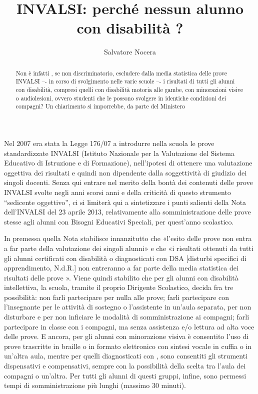 \author{Salvatore Nocera}
\title{INVALSI: perché nessun alunno con disabilità ?}
\label{nocera150513}
\begin{abstract}
Non è infatti , se non discriminatorio, escludere dalla media statistica delle prove INVALSI –- in corso di svolgimento nelle varie scuole –- i risultati di tutti gli alunni con disabilità, compresi quelli con disabilità motoria alle gambe, con minorazioni visive o audiolesioni, ovvero studenti che le possono svolgere in identiche condizioni dei compagni? Un chiarimento si imporrebbe, da parte del Ministero
\end{abstract}
\maketitle
Nel 2007 era stata la Legge 176/07 a introdurre nella scuola le prove standardizzate INVALSI (Istituto Nazionale per la Valutazione del Sistema Educativo di Istruzione e di Formazione), nell'ipotesi di ottenere una valutazione oggettiva dei risultati e quindi non dipendente dalla soggettività di giudizio dei singoli docenti.
Senza qui entrare nel merito della bontà dei contenuti delle prove INVALSI svolte negli anni scorsi anni e della criticità di questo strumento “sedicente oggettivo”, ci si limiterà qui a sintetizzare i punti salienti della Nota dell'INVALSI del 23 aprile 2013, relativamente alla somministrazione delle prove stesse agli alunni con Bisogni Educativi Speciali, per quest'anno scolastico.

In premessa quella Nota stabilisce innanzitutto che «l'esito delle prove non entra a far parte della valutazione dei singoli alunni» e che «i risultati ottenuti da tutti gli alunni certificati con disabilità o diagnosticati con DSA [disturbi specifici di apprendimento, N.d.R.] non entreranno a far parte della media statistica dei risultati delle prove ».
Viene quindi stabilito che per gli alunni con disabilità intellettiva, la scuola, tramite il proprio Dirigente Scolastico, decida fra tre possibilità: non farli partecipare per nulla alle prove; farli partecipare con l'insegnante per le attività di sostegno o l'assistente in un'aula separata, per non disturbare e per non inficiare le modalità di somministrazione ai compagni; farli partecipare in classe con i compagni, ma senza assistenza e/o lettura ad alta voce delle prove.
E ancora, per gli alunni con minorazione visiva è consentito l'uso di prove trascritte in braille o in formato elettronico con sintesi vocale in cuffia o in un'altra aula, mentre per quelli diagnosticati con , sono consentiti gli strumenti dispensativi e compensativi, sempre con la possibilità della scelta tra l'aula dei compagni o un'altra.
Per tutti gli alunni di questi gruppi, infine, sono permessi tempi di somministrazione più lunghi (massimo 30 minuti).


